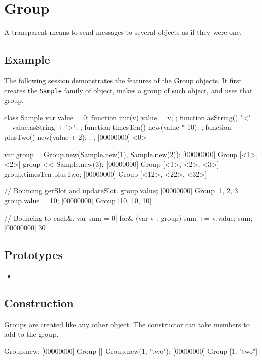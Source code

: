 \section{Group}
A transparent means to send messages to several objects as if they
were one.

\subsection{Example}

The following session demonstrates the features of the Group
objects.  It first creates the \lstinline|Sample| family of object,
makes a group of such object, and uses that group.

\begin{urbiscript}[firstnumber=1]
class Sample
{
  var value = 0;
  function init(v) { value = v; };
  function asString() { "<" + value.asString + ">"; };
  function timesTen() { new(value * 10); };
  function plusTwo()  { new(value + 2); };
};
[00000000] <0>

var group = Group.new(Sample.new(1), Sample.new(2));
[00000000] Group [<1>, <2>]
group << Sample.new(3);
[00000000] Group [<1>, <2>, <3>]
group.timesTen.plusTwo;
[00000000] Group [<12>, <22>, <32>]

// Bouncing getSlot and updateSlot.
group.value;
[00000000] Group [1, 2, 3]
group.value = 10;
[00000000] Group [10, 10, 10]

// Bouncing to each&.
var sum = 0|
for& (var v : group)
  sum += v.value;
sum;
[00000000] 30
\end{urbiscript}

\subsection{Prototypes}

\begin{itemize}
\item {}
\end{itemize}

\subsection{Construction}

Groups are created like any other object. The constructor can
take members to add to the group.

\begin{urbiscript}
Group.new;
[00000000] Group []
Group.new(1, "two");
[00000000] Group [1, "two"]
\end{urbiscript}

